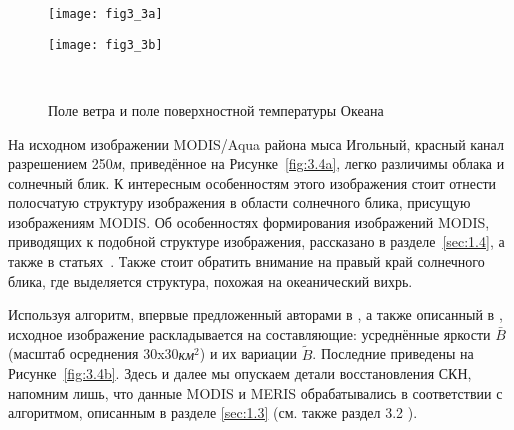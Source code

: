 {\begin{figure}[H]
   	\centering
	\begin{minipage}{.47\textwidth}
	    \subcaptionbox{\label{fig:3.3a}}
		{\texttt{[image: fig3\_3a]}}
	\end{minipage}
	\hfill
	\begin{minipage}{.47\textwidth}
	    \subcaptionbox{\label{fig:3.3b}}
		{\texttt{[image: fig3\_3b]}}
	\end{minipage}
    \\
    \caption{Поле ветра и поле поверхностной температуры Океана}
    \label{fig:3.3}
\end{figure}


На исходном изображении MODIS/Aqua района мыса Игольный, красный канал разрешением 250\textit{м}, приведённое на Рисунке~\ref{fig:3.4a}, легко различимы облака и солнечный блик. К интересным особенностям этого изображения стоит отнести полосчатую структуру изображения в области солнечного блика, присущую изображениям MODIS. Об особенностях формирования изображений MODIS, приводящих к подобной структуре изображения, рассказано в разделе~\ref{sec:1.4}, а также в статьях~\citep{Myasoedov2010a, Myasoedov2010}. Также стоит обратить внимание на правый край солнечного блика, где выделяется структура, похожая на океанический вихрь.

Используя алгоритм, впервые предложенный авторами в \citep{Kudryavtsev2010,Myasoedov2010a}, а также описанный в \citep{Myasoedov2010}, исходное изображение раскладывается на составляющие: усреднённые яркости $\bar{B}$ (масштаб осреднения 30x30\textit{км${}^2$}) и их вариации $\tilde{B}$. Последние приведены на Рисунке~\ref{fig:3.4b}. Здесь и далее мы опускаем детали восстановления СКН, напомним лишь, что данные MODIS и MERIS обрабатывались в соответствии с алгоритмом, описанным в разделе \ref{sec:1.3} (см. также раздел 3.2 \citep{Myasoedov2010}).



}
